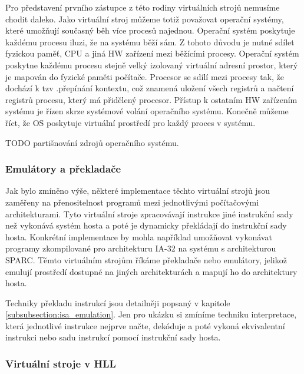     Pro představení prvního zástupce z této rodiny virtuálních strojů nemusíme chodit daleko. Jako virtuální stroj můžeme totiž považovat operační systémy, které umožňují současný běh více procesů najednou. Operační
    systém poskytuje každému procesu iluzi, že na systému běží sám. Z tohoto důvodu je nutné sdílet fyzickou paměť, CPU a jiná HW zařízení mezi běžícími procesy. Operační systém poskytne každému procesu stejně velký
    izolovaný virtuální adresní prostor, který je mapován do fyzické paměti počítače. Procesor se sdílí mezi procesy tak, že dochází k tzv .přepínání kontextu, což znamená uložení všech registrů a načtení registrů
    procesu, který má přidělený procesor. Přístup k ostatním HW zařízením systému je řízen skrze systémové volání operačního systému. Konečně můžeme říct, že OS poskytuje virtuální prostředí pro každý proces v systému.
    
    TODO partišnování zdrojů operačního systému.
    
    \subsubsection*{Emulátory a překladače}
    \label{subsubsection:emulation}
    
    Jak bylo zmíněno výše, některé implementace těchto virtuální strojů jsou zaměřeny na přenositelnost programů mezi jednotlivými počítačovými architekturami. Tyto virtuální stroje zpracovávají instrukce jiné instrukční
    sady než vykonává systém hosta a poté je dynamicky překládají do instrukční sady hosta. Konkrétní implementace by mohla například umožňovat vykonávat programy zkompilované pro architekturu IA-32 na systému s
    architekturou SPARC. Těmto virtuálním strojům říkáme překladače nebo emulátory, jelikož emulují prostředí dostupné na jiných architekturách a mapují ho do architektury hosta.
    
    Techniky překladu instrukcí jsou detailněji popsaný v kapitole \ref{subsubsection:isa_emulation}. Jen pro ukázku si zmíníme techniku interpretace, která jednotlivé instrukce nejprve načte, dekóduje a poté vykoná
    ekvivalentní instrukci nebo sadu instrukcí pomocí instrukční sady hosta.
    
    \subsubsection*{Virtuální stroje v HLL}
    \label{subsubsection:hll_vm}
    
